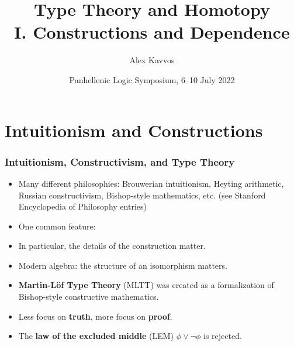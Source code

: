 \documentclass{beamer} %
\title{Type Theory and Homotopy \\ I. Constructions and Dependence}
\author{
		Alex Kavvos %
}
\date{Panhellenic Logic Symposium, 6--10 July 2022}
\begin{document}
\frame{\titlepage}


\section{Intuitionism and Constructions}

\begin{frame}
  \frametitle{Intuitionism, Constructivism, and Type Theory}
  
  \begin{itemize}
    \item Many different philosophies: Brouwerian intuitionism, Heyting
      arithmetic, Russian constructivism, Bishop-style mathematics, etc. (see
      Stanford Encyclopedia of Philosophy entries)

    \item One common feature:
      \begin{center}
      \end{center}
      
    \item In particular, the details of the construction matter.
      
    \item Modern algebra: the structure of an isomorphism matters.

    \item \textbf{Martin-L\"of Type Theory} (MLTT) was created as a
      formalization of Bishop-style constructive mathematics.
      
    \item Less focus on \textbf{truth}, more focus on \textbf{proof}.

    \item The \textbf{law of the excluded middle} (LEM) $\phi \lor \lnot \phi$
      is rejected.
  \end{itemize}

  
\end{frame}
\end{document}
